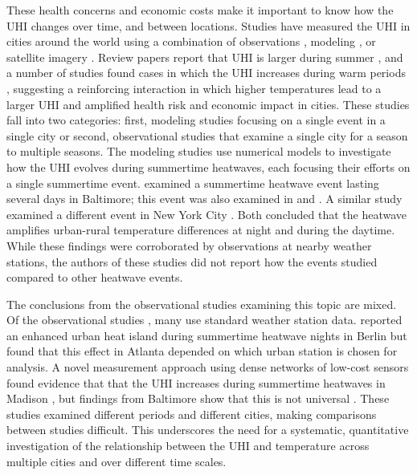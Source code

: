 \documentclass[12pt]{iopart}
\begin{document}
These health concerns and economic costs make it important to know how the UHI changes over time, and between locations. Studies have measured the UHI in cities around the world using a combination of  observations \cite{tan2010urban}, modeling \cite{sharma2017urban,miao2009observational,chemel2012response}, or satellite imagery \cite{peng2011surface}. Review papers report that UHI is larger during summer \cite{oke1982energetic,arnfield2003two}, and a number of studies found cases in which the UHI increases during warm periods
\cite{li2013synergistic,Zhou2010,gabriel2011urban,schatz2015urban,basara2010impact,ramamurthy2017impact,li2014effectiveness,li2015contrasting},
suggesting a reinforcing interaction in which higher temperatures lead to a larger UHI and amplified health risk and economic impact in cities. These studies fall into two categories: first, modeling studies focusing on a single event in a single city or second, observational studies that examine a single city for a season to multiple seasons. 
The modeling studies \cite{li2013synergistic,ramamurthy2017impact,li2014effectiveness,li2015contrasting} use numerical models to investigate how the UHI evolves during summertime heatwaves, each focusing their efforts on a single summertime event.   examined a summertime heatwave event lasting several days in Baltimore; this event was also examined in  and . A similar study examined a different event in New York City \cite{ramamurthy2017impact}. Both concluded that the heatwave amplifies urban-rural temperature differences at night and during the daytime. While these findings were corroborated by observations at nearby weather stations, the authors of these studies did not report how the events studied compared to other heatwave events. 

The conclusions from the observational studies examining this topic are mixed. Of the observational studies \cite{Zhou2010,gabriel2011urban,schatz2015urban}, many use standard weather station data.  reported an enhanced urban heat island during summertime heatwave nights in Berlin but  found that this effect in Atlanta depended on which urban station is chosen for analysis. A novel measurement approach using dense networks of low-cost sensors found evidence that that the UHI increases during summertime heatwaves in Madison \cite{schatz2015urban}, but findings from Baltimore show that this is not universal \cite{scott2016intra}.  These studies examined different periods and different cities, making comparisons between studies difficult. This underscores the need for a systematic, quantitative investigation of the relationship between the UHI and temperature across multiple cities and over different time scales. 
\end{document}
